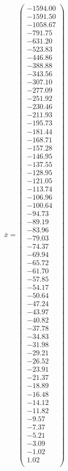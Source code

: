 \documentclass[a4paper,12pt]{article}
\begin{document}
$\bar { x } = \begin{pmatrix}
-1594.00 \\
-1591.50 \\
-1058.67 \\
-791.75 \\
-631.20 \\
-523.83 \\
-446.86 \\
-388.88 \\
-343.56 \\
-307.10 \\
-277.09 \\
-251.92 \\
-230.46 \\
-211.93 \\
-195.73 \\
-181.44 \\
-168.71 \\
-157.28 \\
-146.95 \\
-137.55 \\
-128.95 \\
-121.05 \\
-113.74 \\
-106.96 \\
-100.64 \\
-94.73 \\
-89.19 \\
-83.96 \\
-79.03 \\
-74.37 \\
-69.94 \\
-65.72 \\
-61.70 \\
-57.85 \\
-54.17 \\
-50.64 \\
-47.24 \\
-43.97 \\
-40.82 \\
-37.78 \\
-34.83 \\
-31.98 \\
-29.21 \\
-26.52 \\
-23.91 \\
-21.37 \\
-18.89 \\
-16.48 \\
-14.12 \\
-11.82 \\
-9.57 \\
-7.37 \\
-5.21 \\
-3.09 \\
-1.02 \\
1.02 \\
\end{pmatrix}
$
\end{document}
